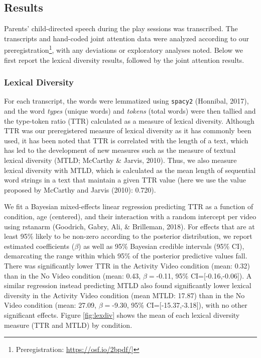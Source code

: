 \documentclass[man,floatsintext]{apa6}
\let\rmarkdownfootnote\footnote%
\def\footnote{\protect\rmarkdownfootnote}
\begin{document}
\hypertarget{results}{%
\subsection{Results}\label{results}}

Parents' child-directed speech during the play sessions was transcribed.
The transcripts and hand-coded joint attention data were analyzed according to our preregistration\footnote{Preregistration: \url{https://osf.io/2bpdf/}{]}}, with any deviations or exploratory analyses noted.
Below we first report the lexical diversity results, followed by the joint attention results.

\hypertarget{lexical-diversity}{%
\subsubsection{Lexical Diversity}\label{lexical-diversity}}

For each transcript, the words were lemmatized using \texttt{spacy2} (Honnibal, 2017), and the word \emph{types} (unique words) and \emph{tokens} (total words) were then tallied and the type-token ratio (TTR) calculated as a measure of lexical diversity.
Although TTR was our preregistered measure of lexical diversity as it has commonly been used, it has been noted that TTR is correlated with the length of a text, which has led to the development of new measures such as the measure of textual lexical diversity (MTLD; McCarthy \& Jarvis, 2010).
Thus, we also measure lexical diversity with MTLD, which is calculated as the mean length of sequential word strings in a text that maintain a given TTR value (here we use the value proposed by McCarthy and Jarvis (2010): 0.720).

We fit a Bayesian mixed-effects linear regression predicting TTR as a function of condition, age (centered), and their interaction with a random intercept per video using rstanarm (Goodrich, Gabry, Ali, \& Brilleman, 2018).
For effects that are at least 95\% likely to be non-zero according to the posterior distribution, we report estimated coefficients (\(\beta\)) as well as 95\% Bayesian credible intervals (95\% CI), demarcating the range within which 95\% of the posterior predictive values fall.
There was significantly lower TTR in the Activity Video condition (mean: 0.32) than in the No Video condition (mean: 0.43, \(\beta=\)-0.11, 95\% CI={[}-0.16,-0.06{]}).
A similar regression instead predicting MTLD also found significantly lower lexical diversity in the Activity Video condition (mean MTLD: 17.87) than in the No Video condition (mean: 27.09, \(\beta=\)-9.30, 95\% CI={[}-15.37,-3.18{]}), with no other significant effects.
Figure \ref{fig:lexdiv} shows the mean of each lexical diversity measure (TTR and MTLD) by condition.
\end{document}
